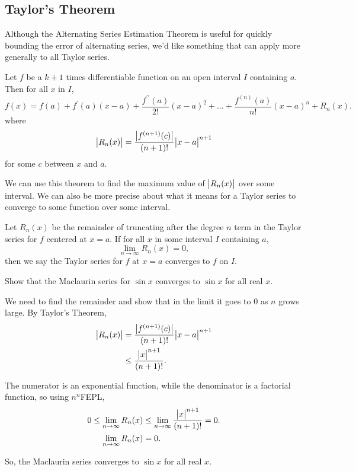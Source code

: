 \subsection{Taylor's Theorem}
Although the Alternating Series Estimation Theorem is useful for quickly bounding the error of alternating series, we'd like something that can apply more generally to all Taylor series.
\begin{theorem}
	Let $f$ be a $k+1$ times differentiable function on an open interval $I$ containing $a$.
	Then for all $x$ in $I$,
	\begin{equation*}
		f(x) = f(a) + f^\prime(a)(x-a) + \frac{f^{\prime\prime}(a)}{2!}(x-a)^2 + \ldots + \frac{f^{(n)}(a)}{n!}(x-a)^n + R_n(x).
	\end{equation*}
	where
	\begin{equation*}
		\big\lvert R_n(x) \big\rvert = \frac{\big\lvert f^{(n+1)}(c) \big\rvert}{(n+1)!}\big\lvert x-a \big\rvert^{n+1}
	\end{equation*}
	for some $c$ between $x$ and $a$.
\end{theorem}

We can use this theorem to find the maximum value of $\big\lvert R_n(x) \big\rvert$ over some interval.
We can also be more precise about what it means for a Taylor series to converge to some function over some interval.
\begin{definition}
	Let $R_n(x)$ be the remainder of truncating after the degree $n$ term in the Taylor series for $f$ centered at $x=a$.
	If for all $x$ in some interval $I$ containing $a$,
	\begin{equation*}
		\lim_{n\to\infty}{R_n(x)} = 0,
	\end{equation*}
	then we say the Taylor series for $f$ at $x=a$ converges to $f$ on $I$.
\end{definition}

\begin{example}
	Show that the Maclaurin series for $\sin{x}$ converges to $\sin{x}$ for all real $x$.
\end{example}
\begin{answer}
	We need to find the remainder and show that in the limit it goes to 0 as $n$ grows large.
	By Taylor's Theorem,
	\begin{align*}
		\big\lvert R_n(x) \big\rvert &= \frac{\big\lvert f^{(n+1)}(c) \big\rvert}{(n+1)!}\big\lvert x-a \big\rvert^{n+1} \\
		&\leq \frac{\big\lvert x \big\rvert^{n+1}}{(n+1)!}.
	\end{align*}
	
	The numerator is an exponential function, while the denominator is a factorial function, so using $n^n$FEPL,
	\begin{align*}
		0 \leq \lim_{n\to\infty}{R_n(x)} &\leq \lim_{n\to\infty}{\frac{\big\lvert x \big\rvert^{n+1}}{(n+1)!}} = 0. \\
		\lim_{n\to\infty}{R_n(x)} &= 0.
	\end{align*}
	
	So, the Maclaurin series converges to $\sin{x}$ for all real $x$.
\end{answer}


